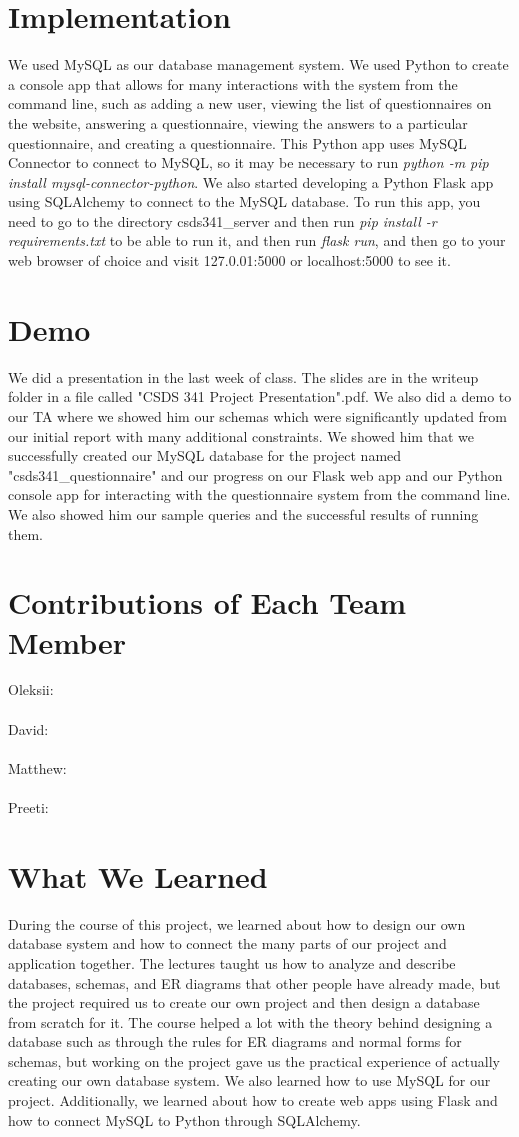 \documentclass[12pt, oneside, a4paper]{article}
\begin{document}
    \section{Implementation}
    We used MySQL as our database management system. We used Python to create a console app that allows for many interactions with the system from the command line, such as adding a new user, viewing the list of questionnaires on the website, answering a questionnaire, viewing the answers to a particular questionnaire, and creating a questionnaire. This Python app uses MySQL Connector to connect to MySQL, so it may be necessary to run \emph{python -m pip install mysql-connector-python}. We also started developing a Python Flask app using SQLAlchemy to connect to the MySQL database. To run this app, you need to go to the directory csds341\_server and then run \emph{pip install -r requirements.txt} to be able to run it, and then run \emph{flask run}, and then go to your web browser of choice and visit 127.0.01:5000 or localhost:5000 to see it.
    \section{Demo}
    We did a presentation in the last week of class. The slides are in the writeup folder in a file called "CSDS 341 Project Presentation".pdf. We also did a demo to our TA where we showed him our schemas which were significantly updated from our initial report with many additional constraints. We showed him that we successfully created our MySQL database for the project named "csds341\_questionnaire" and our progress on our Flask web app and our Python console app for interacting with the questionnaire system from the command line. We also showed him our sample queries and the successful results of running them.
    \section{Contributions of Each Team Member}
    Oleksii:
    \\
    \\
    David:
    \\
    \\
    Matthew:
    \\
    \\
    Preeti:
    \section{What We Learned}
    During the course of this project, we learned about how to design our own database system and how to connect the many parts of our project and application together. The lectures taught us how to analyze and describe databases, schemas, and ER diagrams that other people have already made, but the project required us to create our own project and then design a database from scratch for it. The course helped a lot with the theory behind designing a database such as through the rules for ER diagrams and normal forms for schemas, but working on the project gave us the practical experience of actually creating our own database system. We also learned how to use MySQL for our project. Additionally, we learned about how to create web apps using Flask and how to connect MySQL to Python through SQLAlchemy.
\end{document}

